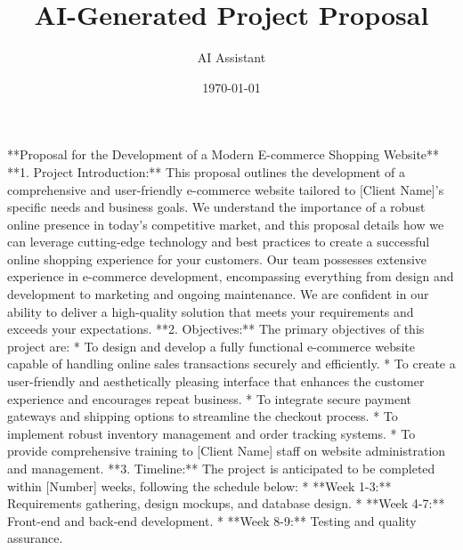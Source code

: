 \documentclass[12pt]{article}%
\title{AI{-}Generated Project Proposal}%
\author{AI Assistant}%
\date{\today}%
\begin{document}
%
\normalsize%
\maketitle%
**Proposal for the Development of a Modern E{-}commerce Shopping Website**\newline%
%
**1. Project Introduction:**\newline%
%
This proposal outlines the development of a comprehensive and user{-}friendly e{-}commerce website tailored to {[}Client Name{]}'s specific needs and business goals.  We understand the importance of a robust online presence in today's competitive market, and this proposal details how we can leverage cutting{-}edge technology and best practices to create a successful online shopping experience for your customers.  Our team possesses extensive experience in e{-}commerce development, encompassing everything from design and development to marketing and ongoing maintenance.  We are confident in our ability to deliver a high{-}quality solution that meets your requirements and exceeds your expectations.\newline%
%
**2. Objectives:**\newline%
%
The primary objectives of this project are:\newline%
%
* To design and develop a fully functional e{-}commerce website capable of handling online sales transactions securely and efficiently.\newline%
%
* To create a user{-}friendly and aesthetically pleasing interface that enhances the customer experience and encourages repeat business.\newline%
%
* To integrate secure payment gateways and shipping options to streamline the checkout process.\newline%
%
* To implement robust inventory management and order tracking systems.\newline%
%
* To provide comprehensive training to {[}Client Name{]} staff on website administration and management.\newline%
%
**3. Timeline:**\newline%
%
The project is anticipated to be completed within {[}Number{]} weeks, following the schedule below:\newline%
%
* **Week 1{-}3:** Requirements gathering, design mockups, and database design.\newline%
%
* **Week 4{-}7:** Front{-}end and back{-}end development.\newline%
%
* **Week 8{-}9:** Testing and quality assurance.\newline%
\end{document}
